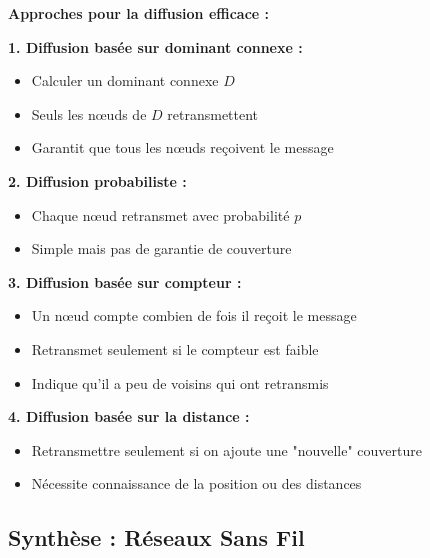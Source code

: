 \documentclass[12pt,a4paper]{article}
\begin{document}
\begin{algorithme}
\textbf{Approches pour la diffusion efficace :}

\textbf{1. Diffusion basée sur dominant connexe :}
\begin{itemize}
    \item Calculer un dominant connexe $D$
    \item Seuls les nœuds de $D$ retransmettent
    \item Garantit que tous les nœuds reçoivent le message
\end{itemize}

\textbf{2. Diffusion probabiliste :}
\begin{itemize}
    \item Chaque nœud retransmet avec probabilité $p$
    \item Simple mais pas de garantie de couverture
\end{itemize}

\textbf{3. Diffusion basée sur compteur :}
\begin{itemize}
    \item Un nœud compte combien de fois il reçoit le message
    \item Retransmet seulement si le compteur est faible
    \item Indique qu'il a peu de voisins qui ont retransmis
\end{itemize}

\textbf{4. Diffusion basée sur la distance :}
\begin{itemize}
    \item Retransmettre seulement si on ajoute une "nouvelle" couverture
    \item Nécessite connaissance de la position ou des distances
\end{itemize}
\end{algorithme}

\newpage
\subsection{Synthèse : Réseaux Sans Fil}
\end{document}
